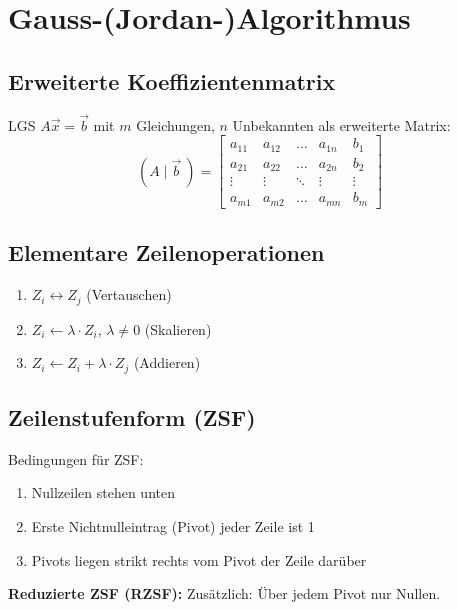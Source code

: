 \section{Gauss-(Jordan-)Algorithmus}

\subsection{Erweiterte Koeffizientenmatrix}
LGS $A\vec{x} = \vec{b}$ mit $m$ Gleichungen, $n$ Unbekannten als erweiterte Matrix:
\begin{equation*}
    (A \mid \vec{b} \ ) = \left[
        \begin{array}{cccc|c}
            a_{11} & a_{12} & \dots  & a_{1n} & b_1    \\
            a_{21} & a_{22} & \dots  & a_{2n} & b_2    \\
            \vdots & \vdots & \ddots & \vdots & \vdots \\
            a_{m1} & a_{m2} & \dots  & a_{mn} & b_m
        \end{array}
        \right]
\end{equation*}

\subsection{Elementare Zeilenoperationen}
\begin{enumerate}
    \item $Z_i \leftrightarrow Z_j$ \quad (Vertauschen)
    \item $Z_i \leftarrow \lambda \cdot Z_i$, $\lambda \neq 0$ \quad (Skalieren)
    \item $Z_i \leftarrow Z_i + \lambda \cdot Z_j$ \quad (Addieren)
\end{enumerate}

\subsection{Zeilenstufenform (ZSF)}
Bedingungen für ZSF:
\begin{enumerate}
    \item Nullzeilen stehen unten
    \item Erste Nichtnulleintrag (Pivot) jeder Zeile ist 1
    \item Pivots liegen strikt rechts vom Pivot der Zeile darüber
\end{enumerate}

\textbf{Reduzierte ZSF (RZSF):} Zusätzlich: Über jedem Pivot nur Nullen.

